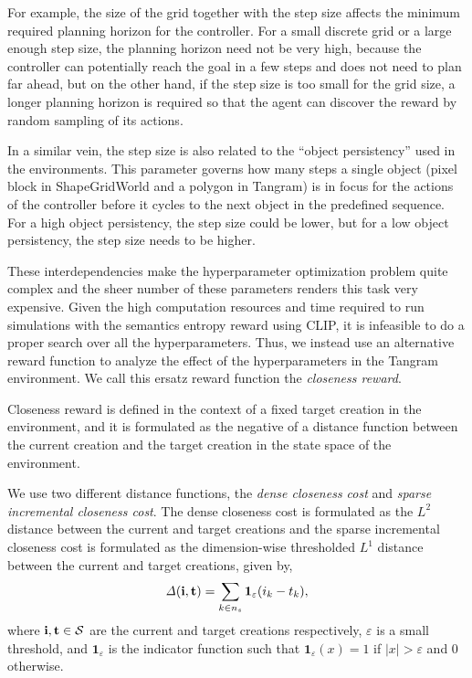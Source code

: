 For example, the size of the grid together with the step size affects the minimum required planning horizon for the controller.
For a small discrete grid or a large enough step size, the planning horizon need not be very high, because the controller can potentially reach the goal in a few steps and does not need to plan far ahead, but on the other hand, if the step size is too small for the grid size, a longer planning horizon is required so that the agent can discover the reward by random sampling of its actions.

In a similar vein, the step size is also related to the ``object persistency'' used in the environments.
This parameter governs how many steps a single object (pixel block in ShapeGridWorld and a polygon in Tangram) is in focus for the actions of the controller before it cycles to the next object in the predefined sequence.
For a high object persistency, the step size could be lower, but for a low object persistency, the step size needs to be higher.

These interdependencies make the hyperparameter optimization problem quite complex and the sheer number of these parameters renders this task very expensive.
Given the high computation resources and time required to run simulations with the semantics entropy reward using CLIP, it is infeasible to do a proper search over all the hyperparameters.
Thus, we instead use an alternative reward function to analyze the effect of the hyperparameters in the Tangram environment.
We call this ersatz reward function the \emph{closeness reward}.

Closeness reward is defined in the context of a fixed target creation in the environment, and it is formulated as the negative of a distance function between the current creation and the target creation in the state space of the environment.

We use two different distance functions, the \emph{dense closeness cost} and \emph{sparse incremental closeness cost}.
The dense closeness cost is formulated as the \(L^2\) distance between the current and target creations and the sparse incremental closeness cost is formulated as the dimension-wise thresholded \(L^1\) distance between the current and target creations, given by,
\begin{equation}
    \label{eq:closeness-reward-sparse}
    \mathit{\Delta}(\mathbf{i}, \mathbf{t}) = \sum_{k \in n_s} \bm{1}_\varepsilon(i_k - t_k),
\end{equation}
where \(\mathbf{i}, \mathbf{t} \in \mathcal{S}\) are the current and target creations respectively, \(\varepsilon\) is a small threshold, and \(\bm{1}_\varepsilon\) is the indicator function such that \(\bm{1}_\varepsilon(x) = 1\) if \(|x| > \varepsilon\) and \(0\) otherwise.

